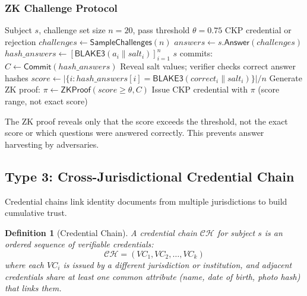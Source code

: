 \documentclass[11pt,a4paper]{article}
\newtheorem{definition}{Definition}
\begin{document}
\subsubsection{ZK Challenge Protocol}

\begin{algorithm}[H]
\caption{Cultural Knowledge Proof Protocol}
\label{alg:ckp}
\begin{algorithmic}[1]
\Require Subject $s$, challenge set size $n = 20$, pass threshold $\theta = 0.75$
\Ensure CKP credential or rejection
\State $\mathit{challenges} \leftarrow \mathsf{SampleChallenges}(n)$ 
\State $\mathit{answers} \leftarrow s.\mathsf{Answer}(\mathit{challenges})$
\State $\mathit{hash\_answers} \leftarrow [\mathsf{BLAKE3}(a_i \| \mathit{salt}_i)]_{i=1}^{n}$
\State $s$ commits: $C \leftarrow \mathsf{Commit}(\mathit{hash\_answers})$
\State Reveal salt values; verifier checks correct answer hashes
\State $\mathit{score} \leftarrow |\{i : \mathit{hash\_answers}[i] = \mathsf{BLAKE3}(\mathit{correct}_i \| \mathit{salt}_i)\}| / n$
    \State Generate ZK proof: $\pi \leftarrow \mathsf{ZKProof}(\mathit{score} \geq \theta, C)$
    \State Issue CKP credential with $\pi$ (score range, not exact score)
\EndIf
\end{algorithmic}
\end{algorithm}

The ZK proof reveals only that the score exceeds the threshold, not the exact score or which questions were answered correctly. This prevents answer harvesting by adversaries.

\subsection{Type 3: Cross-Jurisdictional Credential Chain}

Credential chains link identity documents from multiple jurisdictions to build cumulative trust.

\begin{definition}[Credential Chain]
A credential chain $\mathcal{CH}$ for subject $s$ is an ordered sequence of verifiable credentials:
\begin{equation}
    \mathcal{CH} = (VC_1, VC_2, \ldots, VC_k)
\end{equation}
where each $VC_i$ is issued by a different jurisdiction or institution, and adjacent credentials share at least one common attribute (name, date of birth, photo hash) that links them.
\end{definition}
\end{document}

